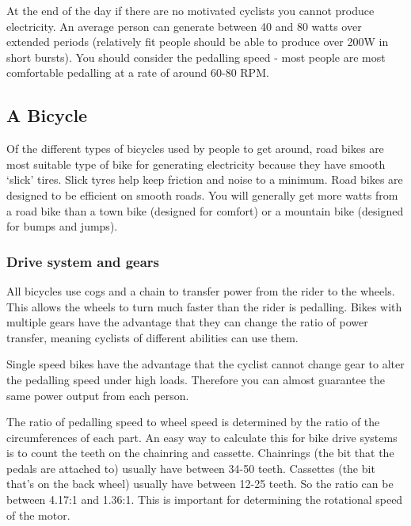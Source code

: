 \documentclass{article}
\theoremstyle{definition}
\theoremstyle{definition}
\theoremstyle{remark}
\begin{document}
    At the end of the day if there are no motivated cyclists you cannot produce electricity. An average person can generate between 40 and 80 watts over extended periods (relatively fit people should be able to produce over 200W in short bursts). You should consider the pedalling speed - most people are most comfortable pedalling at a rate of around 60-80 RPM.
  

  {\color{blue}\subsection{A Bicycle}} %
  \label{sub:a_bicycle}

    Of the different types of bicycles used by people to get around, road bikes are most suitable type of bike for generating electricity because they have smooth ‘slick’ tires. Slick tyres help keep friction and noise to a minimum. Road bikes are designed to be efficient on smooth roads. You will generally get more watts from a road bike than a town bike (designed for comfort) or a mountain bike (designed for bumps and jumps).
  
    \subsubsection{Drive system and gears} %
    \label{ssub:drive_system_and_gears}

      All bicycles use cogs and a chain to transfer power from the rider to the wheels. This allows the wheels to turn much faster than the rider is pedalling. Bikes with multiple gears have the advantage that they can change the ratio of power transfer, meaning cyclists of different abilities can use them.

      Single speed bikes have the advantage that the cyclist cannot change gear to alter the pedalling speed under high loads. Therefore you can almost guarantee the same power output from each person.

      The ratio of pedalling speed to wheel speed is determined by the ratio of the circumferences of each part. An easy way to calculate this for bike drive systems is to count the teeth on the chainring and cassette. Chainrings (the bit that the pedals are attached to) usually have between 34-50 teeth. Cassettes (the bit that’s on the back wheel) usually have between 12-25 teeth. So the ratio can be between 4.17:1 and 1.36:1.
      This is important for determining the rotational speed of the motor. 
\end{document}
